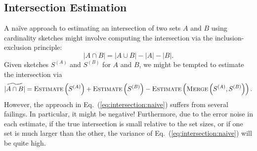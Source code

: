 \documentclass[10]{article}
\newcommand{\algoname}[1]{\textnormal{\textsc{#1}}}
\begin{document}
\subsection{Intersection Estimation}
 \label{DS:sec:HLL:intersection}

A na\"ive approach to estimating an intersection of two sets $A$ and $B$ using cardinality sketches might involve computing the intersection via the inclusion-exclusion principle:
%
\begin{equation} \label{eq:inclusion-exclusion}
	|A \cap B| = |A \cup B| - |A| - |B|.
\end{equation}
%
Given sketches $S^{(A)}$ and $S^{(B)}$ for $A$ and $B$, we might be tempted to estimate the intersection via
%
\begin{equation} \label{eq:intersection:naive}
	\widetilde{|A \cap B|} 
	= \algoname{Estimate} \left ( S^{(A)} \right ) 
	+ \algoname{Estimate} \left ( S^{(B)} \right ) 
	- \algoname{Estimate} \left ( \algoname{Merge} \left ( S^{(A)}, S^{(B)} \right ) \right ).
\end{equation}
%
However, the approach in Eq.~(\ref{eq:intersection:naive}) suffers from several failings.
In particular, it might be negative!
Furthermore, due to the error noise in each estimate, if the true intersection is small relative to the set sizes, or if one set is much larger than the other, the variance of Eq.~(\ref{eq:intersection:naive}) will be quite high.
\end{document}
